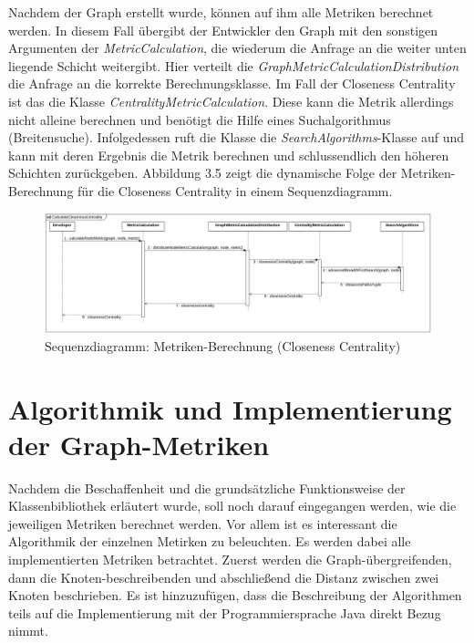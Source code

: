 \documentclass[a4paper,12pt,ngerman,chapterprefix=false,listof=totoc,bibliography=totoc]{scrreprt}
\begin{document}
{{{Nachdem der Graph erstellt wurde, können auf ihm alle Metriken berechnet werden. In diesem Fall übergibt der Entwickler den Graph mit den sonstigen Argumenten der \textit{MetricCalculation}, die wiederum die Anfrage an die weiter unten liegende Schicht weitergibt. Hier verteilt die \textit{GraphMetricCalculationDistribution} die Anfrage an die korrekte Berechnungsklasse. Im Fall der Closeness Centrality ist das die Klasse \textit{CentralityMetricCalculation}. Diese kann die Metrik allerdings nicht alleine berechnen und benötigt die Hilfe eines Suchalgorithmus (Breitensuche). Infolgedessen ruft die Klasse die \textit{SearchAlgorithms}-Klasse auf und kann mit deren Ergebnis die Metrik berechnen und schlussendlich den höheren Schichten zurückgeben. Abbildung 3.5 zeigt die dynamische Folge der Metriken-Berechnung für die Closeness Centrality in einem Sequenzdiagramm.
\begin{figure}[ht!]
	\centering
	\includegraphics[scale=.22]{Abbildungen/UML/sequence_metric_calc.png}
	\caption[Sequenzdiagramm: Metriken-Berechnung (Closeness Centrality)]{Sequenzdiagramm: Metriken-Berechnung (Closeness Centrality)}
\end{figure}
}
\section{Algorithmik und Implementierung der Graph-Metriken}
{
Nachdem die Beschaffenheit und die grundsätzliche Funktionsweise der Klassenbibliothek erläutert wurde, soll noch darauf eingegangen werden, wie die jeweiligen Metriken berechnet werden. Vor allem ist es interessant die Algorithmik der einzelnen Metirken zu beleuchten. Es werden dabei alle implementierten Metriken betrachtet. Zuerst werden die Graph-übergreifenden, dann die Knoten-beschreibenden und abschließend die Distanz zwischen zwei Knoten beschrieben. Es ist hinzuzufügen, dass die Beschreibung der Algorithmen teils auf die Implementierung mit der Programmiersprache Java direkt Bezug nimmt.
}
}}
\end{document}

